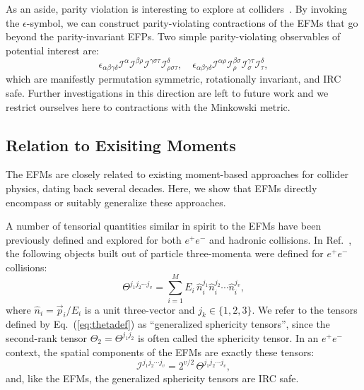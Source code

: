 \documentclass[aps,prd,floatfix,preprintnumbers,twocolumn,groupedaddress,nofootinbib,longbibliography,10pt]{revtex4-1}
\newcommand{\I}{\mathcal{I}}
\DeclareRobustCommand{\Eq}[1]{Eq.~(\ref{#1})}
\DeclareRobustCommand{\Ref}[1]{Ref.~\cite{#1}}
\begin{document}
As an aside, parity violation is interesting to explore at colliders~\cite{Nachtmann:1977ek,Dalitz:1988ab,Efremov:1992pe,Brandenburg:1995nv,Chatrchyan:2012dc,Aad:2015uau,Khachatryan:2016yte,Sirunyan:2018swq,Lester:2019bso}.
%
By invoking the $\epsilon$-symbol, we can construct parity-violating contractions of the EFMs that go beyond the parity-invariant EFPs.
%
Two simple parity-violating observables of potential interest are:
%
\begin{equation}
\label{eq:parity}
\epsilon_{\alpha\beta\gamma\delta}\I^{\alpha}\I^{\beta\rho}\I^{\gamma\sigma\tau}\I^\delta_{\rho\sigma\tau},\quad\epsilon_{\alpha\beta\gamma\delta}\I^{\alpha\rho}\I^{\beta\sigma}_\rho\I^{\gamma\tau}_\sigma\I^\delta_\tau,
\end{equation}
%
which are manifestly permutation symmetric, rotationally invariant, and IRC safe.
%
Further investigations in this direction are left to future work and we restrict ourselves here to contractions with the Minkowski metric.


\subsection{Relation to Exisiting Moments}
\label{subsec:existing_moments}


The EFMs are closely related to existing moment-based approaches for collider physics, dating back several decades.
%
Here, we show that EFMs directly encompass or suitably generalize these approaches.


A number of tensorial quantities similar in spirit to the EFMs have been previously defined and explored for both $e^+e^-$ and hadronic collisions.
%
In \Ref{Donoghue:1979vi}, the following objects built out of particle three-momenta were defined for $e^+e^-$ collisions:
\begin{equation}
\label{eq:thetadef}
\Theta^{j_1j_2\cdots j_v} = \sum_{i=1}^M E_i \,  \hat n_i^{j_1}  \hat n_i^{j_2} \cdots  \hat n_i^{j_v},
\end{equation}
%
where $ \hat n_i=\vec p_i/E_i$ is a unit three-vector and $j_k\in\{1,2,3\}$.
%
We refer to the tensors defined by \Eq{eq:thetadef} as ``generalized sphericity tensors'', since the second-rank tensor $\Theta_2=\Theta^{j_1j_2}$ is often called the sphericity tensor.
%
In an $e^+e^-$ context, the spatial components of the EFMs are exactly these tensors:
\begin{equation}
\mathcal I^{j_1j_2\cdots j_v}=2^{v/2}\,\Theta^{j_1j_2\cdots j_v},
\end{equation}
%
and, like the EFMs, the generalized sphericity tensors are IRC safe.
\end{document}
